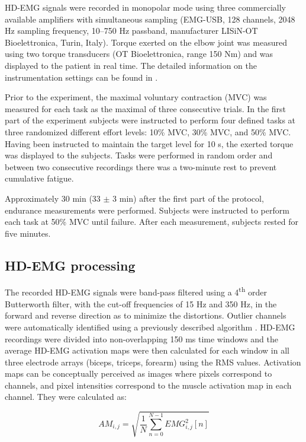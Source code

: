 HD-EMG signals were recorded in monopolar mode using three commercially available amplifiers with simultaneous sampling (EMG-USB, 128 channels, 2048 Hz sampling frequency, 10–750 Hz passband, manufacturer LISiN-OT Bioelettronica, Turin, Italy). Torque exerted on the elbow joint was measured using two torque transducers (OT Bioelettronica, range 150 Nm) and was displayed to the patient in real time. The detailed information on the instrumentation settings can be found in \citep{Rojas-Martinez2012}.

Prior to the experiment, the maximal voluntary contraction (MVC) was measured for each task as the maximal of three consecutive trials. In the first part of the experiment subjects were instructed to perform four defined tasks at three randomized different effort levels: 10\% MVC, 30\% MVC, and 50\% MVC. Having been instructed to maintain the target level for 10 s, the exerted torque was displayed to the subjects. Tasks were performed in random order and between two consecutive recordings there was a two-minute rest to prevent cumulative fatigue.

Approximately 30 min (33 $\pm$ 3 min) after the first part of the protocol, endurance measurements were performed. Subjects were instructed to perform each task at 50\% MVC until failure. After each measurement, subjects rested for five minutes.

\subsection{HD-EMG processing}
The recorded HD-EMG signals were band-pass filtered using a 4\textsuperscript{th} order Butterworth filter, with the cut-off frequencies of 15 Hz and 350 Hz, in the forward and reverse direction as to minimize the distortions. Outlier channels were automatically identified using a previously described algorithm \citep{Rojas-Martinez2012}.
HD-EMG recordings were divided into non-overlapping 150 ms time windows and the average HD-EMG activation maps were then calculated for each window in all three electrode arrays (biceps, triceps, forearm) using the RMS values. Activation maps can be conceptually perceived as images where pixels correspond to channels, and pixel intensities correspond to the muscle activation map in each channel. They were calculated as:

\begin{equation} \label{eq:3-1}
AM_{i,j} = \sqrt{\frac{1}{N} \sum_{n=0}^{N-1} EMG_{i,j}^{2}[n] }
\end{equation}

